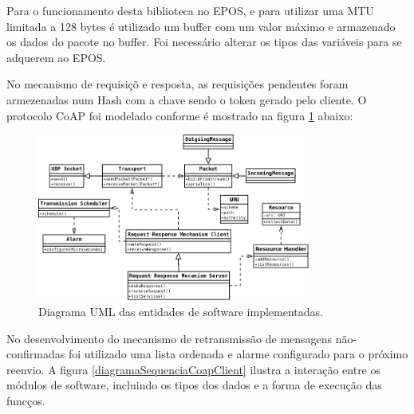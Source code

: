 Para o funcionamento desta biblioteca no EPOS, e para utilizar uma MTU limitada a 128 bytes \'e utilizado um buffer com um valor m\'aximo e armazenado os dados do pacote no buffer. Foi necess\'ario alterar os tipos das vari\'aveis para se adquerem ao EPOS.

No mecanismo de requisi\c{c}\~o e resposta, as requisi\c{c}\~oes pendentes foram armezenadas num Hash com a chave sendo o token gerado pelo cliente. O protocolo CoAP foi modelado conforme \'e mostrado na figura \ref{uml} abaixo:
\begin{figure}[H]
   \label{uml}
   \centering
   \includegraphics[width=0.8\textwidth]{figuras/uml.png}
   \caption{Diagrama UML das entidades de software implementadas.}
\end{figure}

No desenvolvimento do mecanismo de retransmiss\~ao de mensagens n\~ao-confirmadas foi utilizado uma lista ordenada e alarme configurado para o pr\'oximo reenvio. A figura \ref{diagramaSequenciaCoapClient} ilustra a intera\c{c}\~ao entre os m\'odulos de software, incluindo os tipos dos dados e a forma de execu\c{c}\~ao das func\c{c}os.

